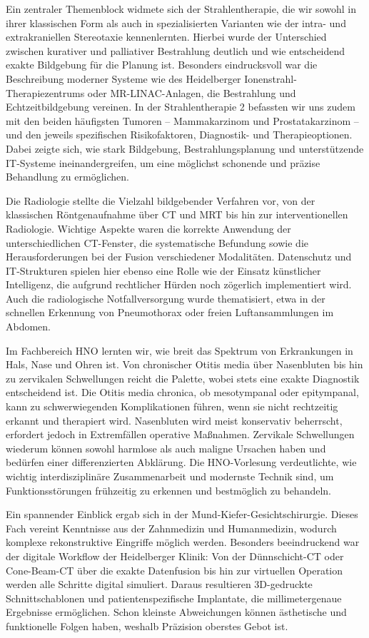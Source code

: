 \documentclass{article}
\begin{document}
Ein zentraler Themenblock widmete sich der Strahlentherapie, die wir sowohl in ihrer klassischen Form als auch in spezialisierten Varianten wie der intra- und extrakraniellen Stereotaxie kennenlernten. Hierbei wurde der Unterschied zwischen kurativer und palliativer Bestrahlung deutlich und wie entscheidend exakte Bildgebung für die Planung ist. Besonders eindrucksvoll war die Beschreibung moderner Systeme wie des Heidelberger Ionenstrahl-Therapiezentrums oder MR-LINAC-Anlagen, die Bestrahlung und Echtzeitbildgebung vereinen. In der Strahlentherapie 2 befassten wir uns zudem mit den beiden häufigsten Tumoren – Mammakarzinom und Prostatakarzinom – und den jeweils spezifischen Risikofaktoren, Diagnostik- und Therapieoptionen. Dabei zeigte sich, wie stark Bildgebung, Bestrahlungsplanung und unterstützende IT-Systeme ineinandergreifen, um eine möglichst schonende und präzise Behandlung zu ermöglichen.

Die Radiologie stellte die Vielzahl bildgebender Verfahren vor, von der klassischen Röntgenaufnahme über CT und MRT bis hin zur interventionellen Radiologie. Wichtige Aspekte waren die korrekte Anwendung der unterschiedlichen CT-Fenster, die systematische Befundung sowie die Herausforderungen bei der Fusion verschiedener Modalitäten. Datenschutz und IT-Strukturen spielen hier ebenso eine Rolle wie der Einsatz künstlicher Intelligenz, die aufgrund rechtlicher Hürden noch zögerlich implementiert wird. Auch die radiologische Notfallversorgung wurde thematisiert, etwa in der schnellen Erkennung von Pneumothorax oder freien Luftansammlungen im Abdomen.

Im Fachbereich HNO lernten wir, wie breit das Spektrum von Erkrankungen in Hals, Nase und Ohren ist. Von chronischer Otitis media über Nasenbluten bis hin zu zervikalen Schwellungen reicht die Palette, wobei stets eine exakte Diagnostik entscheidend ist. Die Otitis media chronica, ob mesotympanal oder epitympanal, kann zu schwerwiegenden Komplikationen führen, wenn sie nicht rechtzeitig erkannt und therapiert wird. Nasenbluten wird meist konservativ beherrscht, erfordert jedoch in Extremfällen operative Maßnahmen. Zervikale Schwellungen wiederum können sowohl harmlose als auch maligne Ursachen haben und bedürfen einer differenzierten Abklärung. Die HNO-Vorlesung verdeutlichte, wie wichtig interdisziplinäre Zusammenarbeit und modernste Technik sind, um Funktionsstörungen frühzeitig zu erkennen und bestmöglich zu behandeln.

Ein spannender Einblick ergab sich in der Mund-Kiefer-Gesichtschirurgie. Dieses Fach vereint Kenntnisse aus der Zahnmedizin und Humanmedizin, wodurch komplexe rekonstruktive Eingriffe möglich werden. Besonders beeindruckend war der digitale Workflow der Heidelberger Klinik: Von der Dünnschicht-CT oder Cone-Beam-CT über die exakte Datenfusion bis hin zur virtuellen Operation werden alle Schritte digital simuliert. Daraus resultieren 3D-gedruckte Schnittschablonen und patientenspezifische Implantate, die millimetergenaue Ergebnisse ermöglichen. Schon kleinste Abweichungen können ästhetische und funktionelle Folgen haben, weshalb Präzision oberstes Gebot ist.
\end{document}
